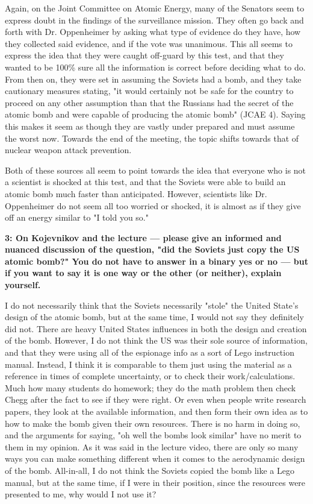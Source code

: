 \documentclass[12pt]{turabian-researchpaper}
\newcommand\question[2]{\textbf{#1: #2}}
\begin{document}
		Again, on the Joint Committee on Atomic Energy, many of the Senators seem to express doubt in the findings of the surveillance mission. They often go back and forth with Dr. Oppenheimer by asking what type of evidence do they have, how they collected said evidence, and if the vote was unanimous. This all seems to express the idea that they were caught off-guard by this test, and that they wanted to be 100\% sure all the information is correct before deciding what to do. From then on, they were set in assuming the Soviets had a bomb, and they take cautionary measures stating, "it would certainly not be safe for the country to proceed on any other assumption than that the Russians had the secret of the atomic bomb and were capable of producing the atomic bomb" (JCAE 4). Saying this makes it seem as though they are vastly under prepared and must assume the worst now. Towards the end of the meeting, the topic shifts towards that of nuclear weapon attack prevention.

		Both of these sources all seem to point towards the idea that everyone who is not a scientist is shocked at this test, and that the Soviets were able to build an atomic bomb much faster than anticipated. However, scientists like Dr. Oppenheimer do not seem all too worried or shocked, it is almost as if they give off an energy similar to "I told you so."

	\question{3}{On Kojevnikov and the lecture — please give an informed and nuanced discussion of the question, "did the Soviets just copy the US atomic bomb?" You do not have to answer in a binary yes or no — but if you want to say it is one way or the other (or neither), explain yourself.}

		I do not necessarily think that the Soviets necessarily "stole" the United State's design of the atomic bomb, but at the same time, I would not say they definitely did not. There are heavy United States influences in both the design and creation of the bomb. However, I do not think the US was their sole source of information, and that they were using all of the espionage info as a sort of Lego instruction manual. Instead, I think it is comparable to them just using the material as a reference in times of complete uncertainty, or to check their work/calculations. Much how many students do homework; they do the math problem then check Chegg after the fact to see if they were right. Or even when people write research papers, they look at the available information, and then form their own idea as to how to make the bomb given their own resources. There is no harm in doing so, and the arguments for saying, "oh well the bombs look similar" have no merit to them in my opinion. As it was said in the lecture video, there are only so many ways you can make something different when it comes to the aerodynamic design of the bomb. All-in-all, I do not think the Soviets copied the bomb like a Lego manual, but at the same time, if I were in their position, since the resources were presented to me, why would I not use it?
\end{document}
